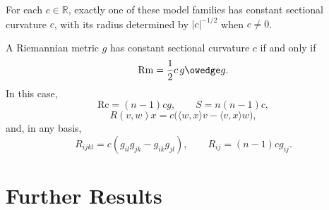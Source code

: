 For each $c\in\mathbb R$, exactly one of these model families has constant
sectional curvature $c$, with its radius determined by $|c|^{-1/2}$ when
$c\ne0$.

\begin{proposition}
\label{prop:constant-sectional-curvature}
A Riemannian metric $g$ has constant sectional curvature $c$ if and only if
\[
\mathrm{Rm}=\frac12c\,g\owedge g.
\]
In this case,
\[
\mathrm{Rc}=(n-1)cg,
\qquad
S=n(n-1)c,
\]
\[
R(v,w)x=c\bigl(\langle w,x\rangle v-\langle v,x\rangle w\bigr),
\]
and, in any basis,
\[
R_{ijkl}=c(g_{il}g_{jk}-g_{ik}g_{jl}),
\qquad
R_{ij}=(n-1)cg_{ij}.
\]
\end{proposition}
\section{Further Results}

